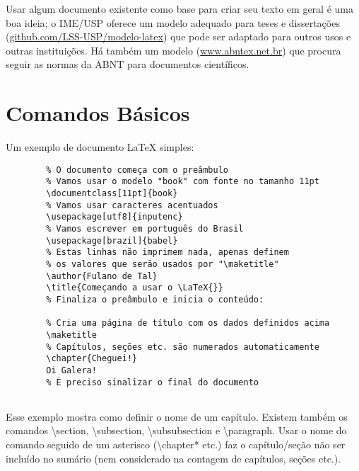 Usar algum documento existente como base para criar seu texto em geral é
uma boa ideia; o IME/USP oferece um modelo adequado para teses e
dissertações (\url{github.com/LSS-USP/modelo-latex}) que pode ser
adaptado para outros usos e outras instituições. Há também um modelo
(\url{www.abntex.net.br}) que procura seguir as normas da ABNT para
documentos científicos.

\section{Comandos Básicos}

Um exemplo de documento \LaTeX{} simples:

\begin{verbatim}
        % O documento começa com o preâmbulo
        % Vamos usar o modelo "book" com fonte no tamanho 11pt
        \documentclass[11pt]{book}
        % Vamos usar caracteres acentuados
        \usepackage[utf8]{inputenc}
        % Vamos escrever em português do Brasil
        \usepackage[brazil]{babel}
        % Estas linhas não imprimem nada, apenas definem
        % os valores que serão usados por "\maketitle"
        \author{Fulano de Tal}
        \title{Começando a usar o \LaTeX{}}
        % Finaliza o preâmbulo e inicia o conteúdo:
        
        % Cria uma página de título com os dados definidos acima
        \maketitle
        % Capítulos, seções etc. são numerados automaticamente
        \chapter{Cheguei!}
        Oi Galera!
        % É preciso sinalizar o final do documento
        
\end{verbatim}

Esse exemplo mostra como definir o nome de um capítulo. Existem também os
comandos \textsf{\textbackslash{}section}, \textsf{\textbackslash{}subsection},
\textsf{\textbackslash{}subsubsection} e \textsf{\textbackslash{}paragraph}.
Usar o nome do comando seguido de um asterisco
(\textsf{\textbackslash{}chapter*} etc.) faz o capítulo/seção não ser incluído
no sumário (nem considerado na contagem de capítulos, seções etc.).

